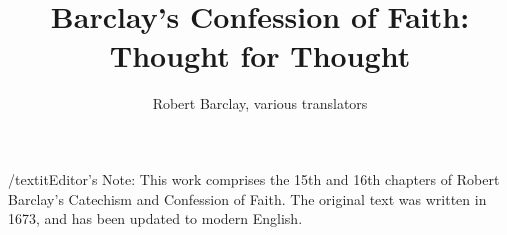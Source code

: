 


\title{Barclay's Confession of Faith: Thought for Thought}
\author{Robert Barclay, various translators}


	
	\maketitle

	/textit{Editor's Note: This work comprises the 15th and 16th chapters of Robert Barclay's Catechism and Confession of Faith. The original text was written in 1673, and has been updated to modern English.}

	
	\tableofcontents
	
	
	
	




